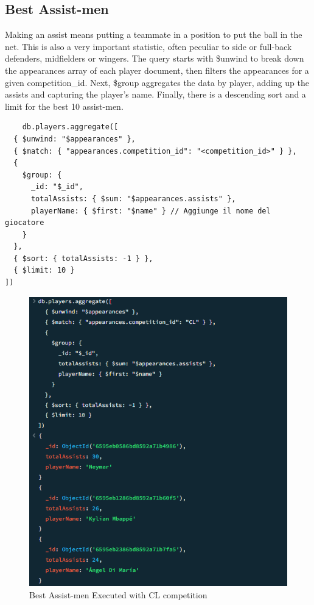 \documentclass{Configuration_Files/PoliMi3i_thesis}
\begin{document}
\subsection{Best Assist-men}
Making an assist means putting a teammate in a position to put the ball in the net. This is also a very important statistic, often peculiar to side or full-back defenders, midfielders or wingers. The query starts with \$unwind to break down the appearances array of each player document, then filters the appearances for a given competition\_id. Next, \$group aggregates the data by player, adding up the assists and capturing the player's name. Finally, there is a descending sort and a limit for the best 10 assist-men.

\begin{verbatim}
    db.players.aggregate([
  { $unwind: "$appearances" },
  { $match: { "appearances.competition_id": "<competition_id>" } },
  { 
    $group: {
      _id: "$_id",
      totalAssists: { $sum: "$appearances.assists" },
      playerName: { $first: "$name" } // Aggiunge il nome del giocatore
    }
  },
  { $sort: { totalAssists: -1 } },
  { $limit: 10 }
])

\end{verbatim}
\begin{figure}[htbp]
    \centering
    \includegraphics[scale=0.6]{Images/Queries/Competitions_statistics/best-assistmen/CL.png}
    \caption{Best Assist-men Executed with CL competition}
\end{figure}
\newpage
\end{document}
